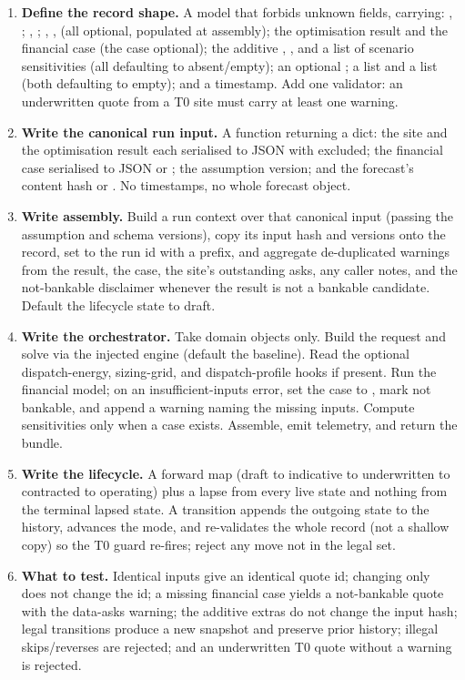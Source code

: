 \begin{rebuild}
\begin{enumerate}
  \item \textbf{Define the record shape.} A model that forbids unknown fields, carrying: , ; , ; , ,  (all optional, populated at assembly); the optimisation result and the financial case (the case optional); the additive , , and a list of scenario sensitivities (all defaulting to absent/empty); an optional ; a  list and a  list (both defaulting to empty); and a  timestamp. Add one validator: an underwritten quote from a T0 site must carry at least one warning.
  \item \textbf{Write the canonical run input.} A function returning a dict: the site and the optimisation result each serialised to JSON with  excluded; the financial case serialised to JSON or ; the assumption version; and the forecast's content hash or . No timestamps, no whole forecast object.
  \item \textbf{Write assembly.} Build a run context over that canonical input (passing the assumption and schema versions), copy its input hash and versions onto the record, set  to the run id with a  prefix, and aggregate de-duplicated warnings from the result, the case, the site's outstanding asks, any caller notes, and the not-bankable disclaimer whenever the result is not a bankable candidate. Default the lifecycle state to draft.
  \item \textbf{Write the orchestrator.} Take domain objects only. Build the request and solve via the injected engine (default the baseline). Read the optional dispatch-energy, sizing-grid, and dispatch-profile hooks if present. Run the financial model; on an insufficient-inputs error, set the case to , mark not bankable, and append a warning naming the missing inputs. Compute sensitivities only when a case exists. Assemble, emit telemetry, and return the bundle.
  \item \textbf{Write the lifecycle.} A forward map (draft to indicative to underwritten to contracted to operating) plus a lapse from every live state and nothing from the terminal lapsed state. A transition appends the outgoing state to the history, advances the mode, and re-validates the whole record (not a shallow copy) so the T0 guard re-fires; reject any move not in the legal set.
  \item \textbf{What to test.} Identical inputs give an identical quote id; changing only  does not change the id; a missing financial case yields a not-bankable quote with the data-asks warning; the additive extras do not change the input hash; legal transitions produce a new snapshot and preserve prior history; illegal skips/reverses are rejected; and an underwritten T0 quote without a warning is rejected.
\end{enumerate}
\end{rebuild}
